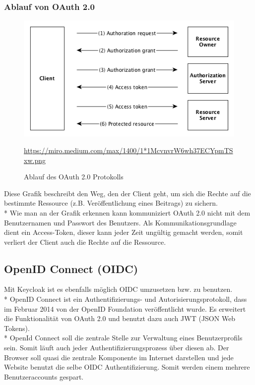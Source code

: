 \subsubsection{Ablauf von OAuth 2.0}
\begin{figure}[htp]
    \centering
    \includegraphics[scale=0.8]{pics/Ablauf_OAuth2.png}
    \caption{Ablauf des OAuth 2.0 Protokolls}
    \small \url{https://miro.medium.com/max/1400/1*1McvnvrW6wh37ECYpmTSxw.png} 
    \label{fig:impl:OAuth2Protocoll}
\end{figure}

Diese Grafik beschreibt den Weg, den der Client geht, um sich die Rechte auf die bestimmte Ressource (z.B. Veröffentlichung eines Beitrags) zu sichern. \\*
Wie man an der Grafik erkennen kann kommuniziert OAuth 2.0 nicht mit dem Benutzernamen und Passwort des Benutzers. 
Als Kommunikationsgrundlage dient ein Access-Token, dieser kann jeder Zeit ungültig gemacht werden, somit verliert der Client auch die Rechte auf die Ressource. \cite{KeycloakCodeCentric}

\subsection{OpenID Connect (OIDC)}
Mit Keycloak ist es ebenfalls möglich OIDC umzusetzen bzw. zu benutzen. \\*
OpenID Connect ist ein Authentifizierungs- und Autorisierungsprotokoll, dass im Februar 2014 von der OpenID Foundation veröffentlicht wurde.
Es erweitert die Funktionalität von OAuth 2.0 und benutzt dazu auch JWT (JSON Web Tokens). \\*
OpenId Connect soll die zentrale Stelle zur Verwaltung eines Benutzerprofils sein. Somit läuft auch jeder Authentifizierungsprozess über diesen ab.
Der Browser soll quasi die zentrale Komponente im Internet darstellen und jede Website benutzt die selbe OIDC Authentifizierung. Somit werden einem mehrere Benutzeraccounts gespart. \cite{KeycloakCodeCentric}
\pagebreak

